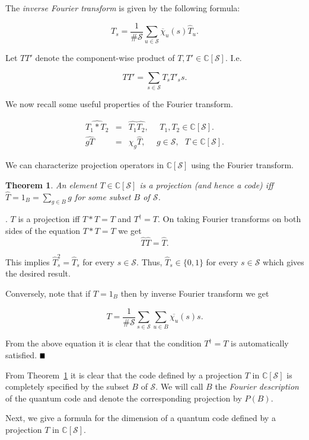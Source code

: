 \documentclass{Rinton-P9x6}
\newtheorem{theorem}{Theorem}[section]
\newcommand{\bproof}{\noindent{\it Proof}}
\newcommand{\eproof}{\hspace*{\fill}$\rule{2mm}{2mm}$~~~~~\bigskip}
\renewenvironment{proof}{\bproof. }{\eproof}
\renewcommand{\S}{{\ensuremath{\mathcal{S}}}}
\begin{document}
The \emph{inverse Fourier transform} is given by the following
formula:

\[
T_s= \frac{1}{\#\S} \sum_{u \in \S} \overline{\chi}_u(s) \hat{T}_u .
\]

Let $TT'$ denote the component-wise product of $T, T'\in\mathbb{C}[\S]$. I.e.

\[
TT' =\sum_{s\in\S}T_sT'_s s.
\]

We now recall some useful properties of the Fourier transform.

\begin{eqnarray}
\nonumber
  \widehat{{T_1*T_2}} &=& \hat{T_1}\hat{T_2},~~~~~~ T_1, T_2\in\mathbb{C}[\S]. \\
\nonumber
  \widehat{g T} &=& \chi_g \hat{T},~~~~~~ g\in\S,~~~ T\in\mathbb{C}[\S].
\end{eqnarray}

We can characterize projection operators in $\mathbb{C}[\S]$ using the
Fourier transform.

\begin{theorem}\label{nstab-code}
  An element $T \in \mathbb{C}[\S]$ is a projection (and hence a code) iff
  $\hat{T} = 1_B = \sum_{g \in B} g$ for some subset $B$ of $\S$.
\end{theorem}

\begin{proof}
  $T$ is a projection iff $T*T = T$ and $T^\dagger = T$. On taking
  Fourier transforms on both sides of the equation $T*T = T$ we get
\[
\hat{T} \hat{T} = \hat{T}.
\]

This implies $\hat{T}_s^2=\hat{T}_s$ for every $s\in\S$. Thus,
$\hat{T}_s\in\{0,1\}$ for every $s\in\S$ which gives the desired result.

Conversely, note that if $\hat{T} = 1_B$ then by inverse Fourier
transform we get

\[
T = \frac{1}{\#\S}\sum_{s \in \S} \sum_{u \in B} \overline{\chi_u}(s) s.
\] 

{From} the above equation it is clear that the condition $T^\dagger = T$
is automatically satisfied.
\end{proof}

{From} Theorem~\ref{nstab-code} it is clear that the code defined by a
projection $T$ in $\mathbb{C}[\S]$ is completely specified by the subset $B$
of $\S$. We will call $B$ the {\em Fourier description} of the quantum
code and denote the corresponding projection by $P(B)$. 

Next, we give a formula for the dimension of a quantum code defined by
a projection $T$ in $\mathbb{C}[\S]$.
\end{document}
